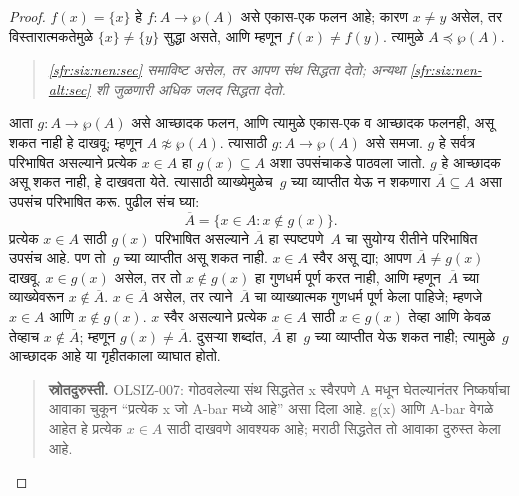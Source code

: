 \documentclass[11pt,a4paper,openany]{book}
\theoremstyle{definition}
\newcommand{\Setabs}[2]{\{#1:#2\}}
\newcommand{\Pow}[1]{\wp(#1)}
\newcommand{\cardle}[2]{#1 \preceq #2}
\newcommand{\cardneq}[2]{#1 \not\approx #2}
\newenvironment{editorial}{\begin{quote}\small\itshape}{\end{quote}}
\begin{document}
\begin{proof}
$f(x) = \{x\}$ हे $f \colon A \to \Pow{A}$ असे एकास-एक फलन आहे;
कारण $x \neq y$ असेल, तर विस्तारात्मकतेमुळे $\{x\} \neq \{y\}$ सुद्धा
असते, आणि म्हणून $f(x) \neq f(y)$. त्यामुळे $\cardle{A}{\Pow{A}}$.

\begin{editorial}
\ref{sfr:siz:nen:sec} समाविष्ट असेल, तर आपण संथ सिद्धता देतो; अन्यथा
\ref{sfr:siz:nen-alt:sec} शी जुळणारी अधिक जलद सिद्धता देतो.
\end{editorial}

%
  आता $g\colon A \to
  \Pow{A}$ असे आच्छादक फलन, आणि त्यामुळे एकास-एक व आच्छादक फलनही,
  असू शकत नाही हे दाखवू; म्हणून $\cardneq{A}{\Pow{A}}$. त्यासाठी
  $g\colon A \to \Pow{A}$ असे समजा. $g$ हे सर्वत्र परिभाषित असल्याने
  प्रत्येक $x \in A$ हा $g(x)
  \subseteq A$ अशा उपसंचाकडे पाठवला जातो. $g$ हे आच्छादक असू शकत नाही,
  हे दाखवता येते. त्यासाठी व्याख्येमुळेच~$g$ च्या व्याप्तीत येऊ न
  शकणारा $\overline{A} \subseteq A$ असा उपसंच परिभाषित करू. पुढील संच घ्या:
  \[
  \overline{A} = \Setabs{x \in A}{x \notin g(x)}.
  \]
  प्रत्येक $x \in A$ साठी $g(x)$ परिभाषित असल्याने $\overline{A}$ हा
  स्पष्टपणे~$A$ चा सुयोग्य रीतीने परिभाषित उपसंच आहे. पण तो~$g$ च्या
  व्याप्तीत असू शकत नाही. $x \in A$ स्वैर असू द्या; आपण
  $\overline{A} \neq g(x)$ दाखवू. $x \in g(x)$ असेल, तर तो
  $x \notin g(x)$ हा गुणधर्म पूर्ण करत नाही, आणि म्हणून~$\overline{A}$
  च्या व्याख्येवरून $x \notin
  \overline{A}$. $x \in \overline{A}$ असेल, तर त्याने~$\overline{A}$
  चा व्याख्यात्मक गुणधर्म पूर्ण केला पाहिजे; म्हणजे $x \in A$ आणि
  $x \notin
  g(x)$. $x$ स्वैर असल्याने प्रत्येक $x \in A$ साठी $x \in g(x)$ तेव्हा
  आणि केवळ तेव्हाच $x \notin \overline{A}$; म्हणून
  $g(x) \neq \overline{A}$.
  दुसऱ्या शब्दांत, $\overline{A}$ हा~$g$ च्या व्याप्तीत येऊ शकत नाही;
  त्यामुळे~$g$ आच्छादक आहे या गृहीतकाला व्याघात होतो.{}
\begin{quote}\small\textbf{स्रोतदुरुस्ती.} OLSIZ-007: गोठवलेल्या संथ सिद्धतेत x स्वैरपणे A मधून घेतल्यानंतर निष्कर्षाचा आवाका चुकून “प्रत्येक x जो A-bar मध्ये आहे” असा दिला आहे. g(x) आणि A-bar वेगळे आहेत हे प्रत्येक $x\in A$ साठी दाखवणे आवश्यक आहे; मराठी सिद्धतेत तो आवाका दुरुस्त केला आहे.\end{quote}
\end{proof}
\end{document}
